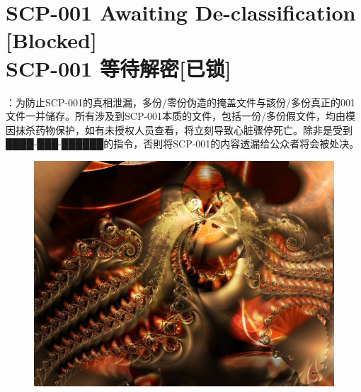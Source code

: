 \chapter[{SCP-001 等待解密[已锁]}]{
	SCP-001 Awaiting De-classification [Blocked] \\
	SCP-001 等待解密[已锁]
}

\label{chap:SCP-001.0}


\hr

\begin{scpboxbr}
：为防止SCP-001的真相泄漏，多份/零份伪造的掩盖文件与該份/多份真正的001文件一并储存。所有涉及到SCP-001本质的文件，包括一份/多份假文件，均由模因抹杀药物保护，如有未授权人员查看，将立刻导致心脏骤停死亡。除非是受到████-███-██████的指令，否則将SCP-001的内容透漏给公众者将会被处决。
\end{scpboxbr}

\hr


\hr

\newpage

\begin{figure}[H]
	\centering
	\includegraphics[width=\textwidth]{images/SCP.001.0.jpg}
\end{figure}

